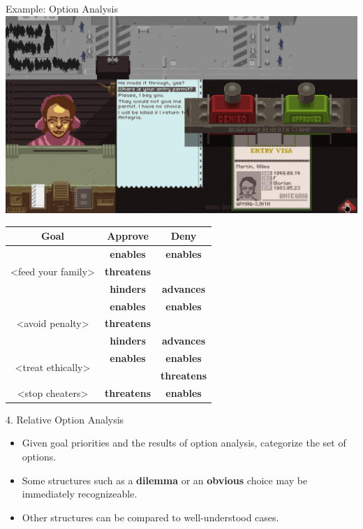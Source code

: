 \documentclass[xcolor=x11names]{beamer}
\begin{document}
\begin{frame}{Example: Option Analysis}
  \centering
  \includegraphics[height=0.3\textheight]{res/papersplease-large.png} \\
  \vspace*{0.2em}
  \footnotesize
  \begin{tabular}{c c c}
    \toprule
    \textbf{Goal} & \textbf{Approve} & \textbf{Deny} \\
    \midrule
    \multirow{3}{*}{<feed your family>} & \textbf{enables} & \textbf{enables} \\
                                        & \textbf{threatens} & \\
                                        & \textbf{hinders} & \textbf{advances} \\
    \midrule

    \multirow{3}{*}{<avoid penalty>} & \textbf{enables} & \textbf{enables} \\
                                     & \textbf{threatens} & \\
                                     & \textbf{hinders} & \textbf{advances} \\
    \midrule

    \multirow{2}{*}{<treat ethically>} & \textbf{enables} & \textbf{enables} \\
                                       & & \textbf{threatens} \\
    \midrule

    <stop cheaters> & \textbf{threatens} & \textbf{enables} \\
    \bottomrule
  \end{tabular}
\end{frame}

\begin{frame}{4. Relative Option Analysis}
  \begin{itemize}\addtolength{\itemsep}{0.5\baselineskip}
    \item Given goal priorities and the results of option analysis, categorize the set of options.
    \item Some structures such as a \textbf{dilemma} or an \textbf{obvious} choice may be immediately recognizeable.
    \item Other structures can be compared to well-understood cases.
  \end{itemize}
\end{frame}
\end{document}
